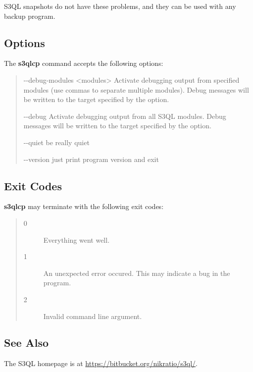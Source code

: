 \documentclass[letterpaper,10pt,english]{sphinxmanual}
\begin{document}
S3QL snapshots do not have these problems, and they can be used with
any backup program.


\subsection{Options}
\label{man/cp:options}
The \textbf{s3qlcp} command accepts the following options:
\begin{quote}
\begin{optionlist}{3cm}
\item [-{-}debug-modules \textless{}modules\textgreater{}]  
Activate debugging output from specified modules (use
commas to separate multiple modules). Debug messages
will be written to the target specified by the
 option.
\item [-{-}debug]  
Activate debugging output from all S3QL modules. Debug
messages will be written to the target specified by
the  option.
\item [-{-}quiet]  
be really quiet
\item [-{-}version]  
just print program version and exit
\end{optionlist}
\end{quote}


\subsection{Exit Codes}
\label{man/cp:exit-codes}
\textbf{s3qlcp} may terminate with the following exit codes:
\begin{quote}\begin{description}
\item[{0}] \leavevmode
Everything went well.

\item[{1}] \leavevmode
An unexpected error occured. This may indicate a bug in the
program.

\item[{2}] \leavevmode
Invalid command line argument.

\end{description}\end{quote}


\subsection{See Also}
\label{man/cp:see-also}
The S3QL homepage is at \href{https://bitbucket.org/nikratio/s3ql/}{https://bitbucket.org/nikratio/s3ql/}.
\end{document}
